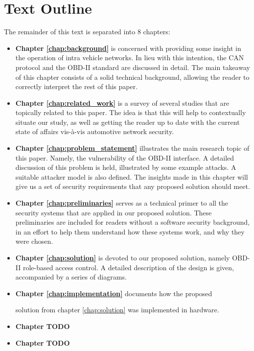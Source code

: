 \section{Text Outline}
The remainder of this text is separated into 8 chapters:
\begin{itemize}
	\item \textbf{Chapter \ref{chap:background}} is concerned with providing some insight in the operation of intra vehicle networks. In lieu with this intention, the CAN protocol and the OBD-II standard are discussed in detail. The main takeaway of this chapter consists of a solid technical background, allowing the reader to correctly interpret the rest of this paper.
	
	\item \textbf{Chapter \ref{chap:related_work}} is a survey of several studies that are topically related to this paper. The idea is that this will help to contextually situate our study, as well as getting the reader up to date with the current state of affairs vis-\`a-vis automotive network security.
	
	\item \textbf{Chapter \ref{chap:problem_statement}} illustrates the main research topic of this paper. Namely, the vulnerability of the OBD-II interface. A detailed discussion of this problem is held, illustrated by some example attacks. A suitable attacker model is also defined. The insights made in this chapter will give us a set of security requirements that any proposed solution should meet.
	
	\item \textbf{Chapter \ref{chap:preliminaries}} serves as a technical primer to all the security systems that are applied in our proposed solution. These preliminaries are included for readers without a software security background, in an effort to help them understand how these systems work, and why they were chosen.
	
	\item \textbf{Chapter \ref{chap:solution}} is devoted to our proposed solution, namely OBD-II role-based access control. A detailed description of the design is given, accompanied by a series of diagrams.
	
	\item \textbf{Chapter \ref{chap:implementation}} documents how the proposed
	
	 solution from chapter \ref{chap:solution} was implemented in hardware. 
	
	\item \textbf{Chapter TODO}
	
	\item \textbf{Chapter TODO}
\end{itemize}